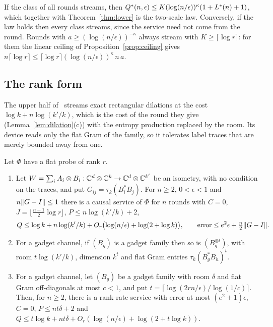 If the class of all rounds streams, then $Q^{*}(n,\epsilon)\le K(\log(n/\epsilon))^\kappa(1+L^{*}(n)+1)$, which together with
Theorem~\ref{thm:lower} is the two-scale law. Conversely, if the law holds then every class streams, since the service need not come from the
round. Rounds with $a\ge(\log(n/\epsilon))^{-\kappa}$ always stream with $K\geq\lceil\log r\rceil$: for them the linear
ceiling of Proposition~\ref{prop:ceiling} gives $n\lceil\log r\rceil\le\lceil\log r\rceil(\log(n/\epsilon))^\kappa\,n\,a$.

\subsection{The rank form}

The upper half of~\cite[Theorem~12.2]{DouglasMghirbiC} streams exact rectangular dilations at the cost $\log k+n\log(k'/k)$, which is the
cost of the round they give (Lemma~\ref{lem:dilation}(c)) with the entropy production replaced by the room. Its device reads only the flat
Gram of the family, so it tolerates label traces that are merely bounded away from one.

\begin{theorem}\label{thm:robust}
Let $\Phi$ have a flat probe of rank $r$.
\begin{enumerate}[label=(\alph*),itemsep=1pt]
\item Let $W=\sum_iA_i\otimes B_i:\mathbb C^d\otimes\mathbb C^k\to\mathbb C^d\otimes\mathbb C^{k'}$ be an isometry, with no condition on the traces, and put
$G_{ij}=\tau_k(B_i^*B_j)$. For $n\ge2$, $0<\epsilon<1$ and $n\lVert G-I\rVert\le1$ there is a causal service of $\Phi$ for $n$ rounds with $C=0$,
$J=\lfloor\frac{n-1}2\log r\rfloor$, $P\le n\log(k'/k)+2$,
\[
Q\le\log k+n\log(k'/k)+O_r\bigl(\log(n/\epsilon)+\log(2+\log k)\bigr),\qquad\text{error}\le e^2\epsilon+\tfrac n2\lVert G-I\rVert.
\]
\item For a gadget channel, if $(B_g)$ is a gadget family then so is $(B_g^{\otimes t})$, with room $t\log(k'/k)$, dimension $k^t$ and flat Gram
entries $\tau_k(B_g^*B_h)^t$.
\item For a gadget channel, let $(B_g)$ be a gadget family with room $\delta$ and flat Gram off-diagonals at most $c<1$, and put
$t=\lceil\log(2rn/\epsilon)/\log(1/c)\rceil$. Then, for $n\ge2$, there is a rank-rate service with error at most $(e^2+1)\epsilon$, $C=0$,
$P\le nt\delta+2$ and $Q\le t\log k+nt\delta+O_r(\log(n/\epsilon)+\log(2+t\log k))$.
\end{enumerate}
\end{theorem}

